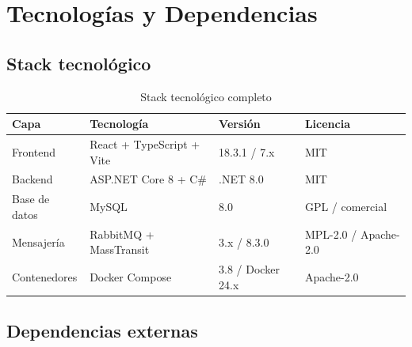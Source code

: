 \documentclass[12pt,letterpaper]{article}
\begin{document}
	\section{Tecnologías y Dependencias}
	
	\subsection{Stack tecnológico}
	
	\begin{table}[H]
		\centering
		\caption{Stack tecnológico completo}
		\label{tab:stack}
		\begin{tabular}{|l|l|l|l|}
			\hline
			\textbf{Capa} & \textbf{Tecnología} & \textbf{Versión} & \textbf{Licencia} \\ \hline
			Frontend & React + TypeScript + Vite & 18.3.1 / 7.x & MIT \\ \hline
			Backend & ASP.NET Core 8 + C\# & .NET 8.0 & MIT \\ \hline
			Base de datos & MySQL & 8.0 & GPL / comercial \\ \hline
			Mensajería & RabbitMQ + MassTransit & 3.x / 8.3.0 & MPL-2.0 / Apache-2.0 \\ \hline
			Contenedores & Docker Compose & 3.8 / Docker 24.x & Apache-2.0 \\ \hline
		\end{tabular}
	\end{table}
	
	\subsection{Dependencias externas}
	
\end{document}
